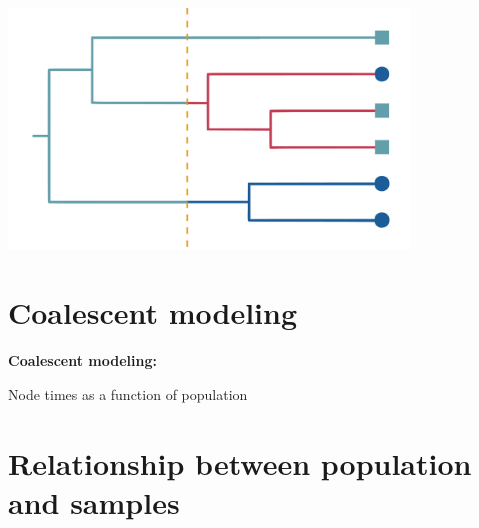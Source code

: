 \documentclass[aspectratio=169]{beamer}
\begin{document}
\begin{frame} \frametitle{\insertsection}

    \begin{center}

        \centering\includegraphics[width=0.8\textwidth]{images/tree-option3}

    \end{center}

\end{frame}


\section{Coalescent modeling}

\begin{frame} 
    \begin{center}
        \begin{huge}
    
            \textbf{Coalescent modeling:}

            Node times as a function of population

        \end{huge}
    \end{center}
\end{frame}

\section{Relationship between population and samples}
\end{document}
